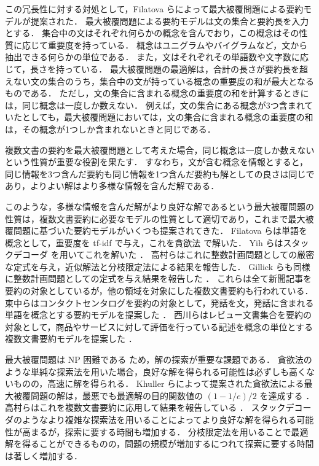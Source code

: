 \documentclass[japanese]{jnlp_1.4}
\begin{document}
この冗長性に対する対処として，Filatova らによって最大被覆問題による要約モデルが提案された\cite{filatova04}．
最大被覆問題による要約モデルは文の集合と要約長を入力とする．
集合中の文はそれぞれ何らかの概念を含んでおり，この概念はその性質に応じて重要度を持っている．
概念はユニグラムやバイグラムなど，文から抽出できる何らかの単位である．
また，文はそれぞれその単語数や文字数に応じて，長さを持っている．
最大被覆問題の最適解は，合計の長さが要約長を超えない文の集合のうち，集合中の文が持っている概念の重要度の和が最大となるものである．
ただし，文の集合に含まれる概念の重要度の和を計算するときには，同じ概念は一度しか数えない．
例えば，文の集合にある概念が3つ含まれていたとしても，最大被覆問題においては，文の集合に含まれる概念の重要度の和は，その概念が1つしか含まれないときと同じである．

複数文書の要約を最大被覆問題として考えた場合，同じ概念は一度しか数えないという性質が重要な役割を果たす．
すなわち，文が含む概念を情報とすると，同じ情報を3つ含んだ要約も同じ情報を1つ含んだ要約も解としての良さは同じであり，よりよい解はより多様な情報を含んだ解である．

このような，多様な情報を含んだ解がより良好な解であるという最大被覆問題の性質は，複数文書要約に必要なモデルの性質として適切であり，これまで最大被覆問題に基づいた要約モデルがいくつも提案されてきた．
Filatova らは単語を概念として，重要度を tf-idf で与え，これを貪欲法 \cite{khuller99} で解いた．
Yih らはスタックデコーダ \cite{jelinek69} を用いてこれを解いた \cite{yih07}．
高村らはこれに整数計画問題としての厳密な定式を与え，近似解法と分枝限定法による結果を報告した\cite{takamura08}．
Gillick らも同様に整数計画問題としての定式を与え結果を報告した \cite{gillick09}．
これらは全て新聞記事を要約の対象としているが，他の領域を対象にした複数文書要約も行われている．
東中らはコンタクトセンタログを要約の対象として，発話を文，発話に含まれる単語を概念とする要約モデルを提案した \cite{higashinaka10b}．
西川らはレビュー文書集合を要約の対象として，商品やサービスに対して評価を行っている記述を概念の単位とする複数文書要約モデルを提案した \cite{nishikawa13}．

最大被覆問題は NP 困難である \cite{khuller99} ため，解の探索が重要な課題である．
貪欲法のような単純な探索法を用いた場合，良好な解を得られる可能性は必ずしも高くないものの，高速に解を得られる．
Khuller らによって提案された貪欲法による最大被覆問題の解は，最悪でも最適解の目的関数値の $(1 - 1/e) / 2$ を達成する \cite{khuller99}．
高村らはこれを複数文書要約に応用して結果を報告している \cite{takamura08}．
スタックデコーダのようなより複雑な探索法を用いることによってより良好な解を得られる可能性が高まるが，探索に要する時間も増加する．
分枝限定法を用いることで最適解を得ることができるものの，問題の規模が増加するにつれて探索に要する時間は著しく増加する．
\end{document}
